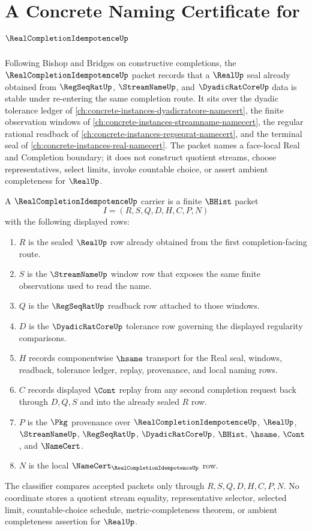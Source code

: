 \chapter{A Concrete Naming Certificate for $\RealCompletionIdempotenceUp$}
\label{ch:concrete-instances-real-completion-idempotence-namecert}

Following Bishop and Bridges on constructive completions, the $\RealCompletionIdempotenceUp$ packet records that a $\RealUp$ seal already obtained from $\RegSeqRatUp$, $\StreamNameUp$, and $\DyadicRatCoreUp$ data is stable under re-entering the same completion route. It sits over the dyadic tolerance ledger of \autoref{ch:concrete-instances-dyadicratcore-namecert}, the finite observation windows of \autoref{ch:concrete-instances-streamname-namecert}, the regular rational readback of \autoref{ch:concrete-instances-regseqrat-namecert}, and the terminal seal of \autoref{ch:concrete-instances-real-namecert}. The packet names a face-local Real and Completion boundary; it does not construct quotient streams, choose representatives, select limits, invoke countable choice, or assert ambient completeness for $\RealUp$.

\begin{definition}
\label{def:real-completion-idempotence-carrier}
A $\RealCompletionIdempotenceUp$ carrier is a finite $\BHist$ packet
$$
I=(R,S,Q,D,H,C,P,N)
$$
with the following displayed rows:
\begin{enumerate}
\item $R$ is the sealed $\RealUp$ row already obtained from the first completion-facing route.
\item $S$ is the $\StreamNameUp$ window row that exposes the same finite observations used to read the name.
\item $Q$ is the $\RegSeqRatUp$ readback row attached to those windows.
\item $D$ is the $\DyadicRatCoreUp$ tolerance row governing the displayed regularity comparisons.
\item $H$ records componentwise $\hsame$ transport for the Real seal, windows, readback, tolerance ledger, replay, provenance, and local naming rows.
\item $C$ records displayed $\Cont$ replay from any second completion request back through $D,Q,S$ and into the already sealed $R$ row.
\item $P$ is the $\Pkg$ provenance over $\RealCompletionIdempotenceUp$, $\RealUp$, $\StreamNameUp$, $\RegSeqRatUp$, $\DyadicRatCoreUp$, $\BHist$, $\hsame$, $\Cont$, and $\NameCert$.
\item $N$ is the local $\NameCert_{\RealCompletionIdempotenceUp}$ row.
\end{enumerate}
The classifier compares accepted packets only through $R,S,Q,D,H,C,P,N$. No coordinate stores a quotient stream equality, representative selector, selected limit, countable-choice schedule, metric-completeness theorem, or ambient completeness assertion for $\RealUp$.
\end{definition}

